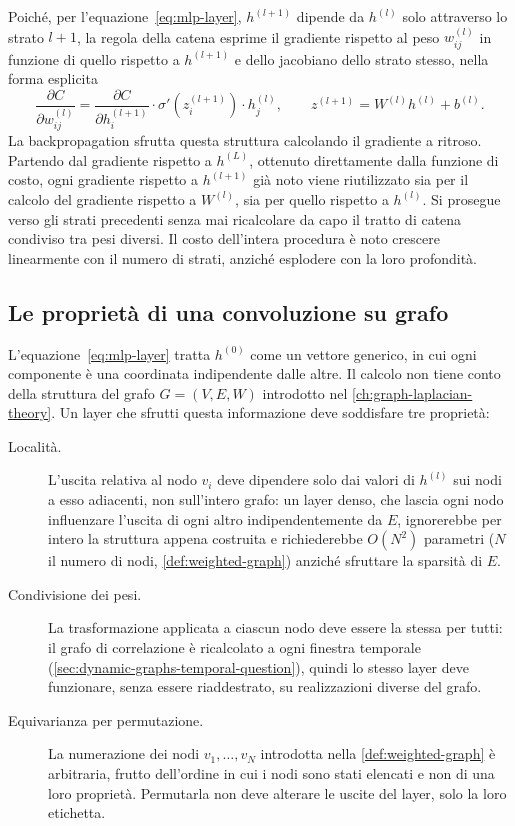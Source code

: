 Poiché, per l'equazione~\eqref{eq:mlp-layer}, $h^{(l+1)}$ dipende da $h^{(l)}$ solo attraverso lo strato $l+1$, la regola della catena esprime il gradiente rispetto al peso $w^{(l)}_{ij}$ in funzione di quello rispetto a $h^{(l+1)}$ e dello jacobiano dello strato stesso, nella forma esplicita
\begin{equation}
\label{eq:backprop-weight-gradient}
\frac{\partial C}{\partial w^{(l)}_{ij}} = \frac{\partial C}{\partial h^{(l+1)}_i} \cdot \sigma'\!\left(z^{(l+1)}_i\right) \cdot h^{(l)}_j, \qquad z^{(l+1)} = W^{(l)}h^{(l)} + b^{(l)}.
\end{equation}
La backpropagation sfrutta questa struttura calcolando il gradiente a ritroso. Partendo dal gradiente rispetto a $h^{(L)}$, ottenuto direttamente dalla funzione di costo, ogni gradiente rispetto a $h^{(l+1)}$ già noto viene riutilizzato sia per il calcolo del gradiente rispetto a $W^{(l)}$, sia per quello rispetto a $h^{(l)}$. Si prosegue verso gli strati precedenti senza mai ricalcolare da capo il tratto di catena condiviso tra pesi diversi. Il costo dell'intera procedura è noto crescere linearmente con il numero di strati, anziché esplodere con la loro profondità.

\subsection{Le proprietà di una convoluzione su grafo}
\label{sec:message-passing-paradigm}

L'equazione~\eqref{eq:mlp-layer} tratta $h^{(0)}$ come un vettore generico, in cui ogni componente è una coordinata indipendente dalle altre. Il calcolo non tiene conto della struttura del grafo $G=(V,E,W)$ introdotto nel \cref{ch:graph-laplacian-theory}. Un layer che sfrutti questa informazione deve soddisfare tre proprietà:

\begin{description}
    \item[Località.] L'uscita relativa al nodo $v_i$ deve dipendere solo dai valori di $h^{(l)}$ sui nodi a esso adiacenti, non sull'intero grafo: un layer denso, che lascia ogni nodo influenzare l'uscita di ogni altro indipendentemente da $E$, ignorerebbe per intero la struttura appena costruita e richiederebbe $O(N^2)$ parametri ($N$ il numero di nodi, \cref{def:weighted-graph}) anziché sfruttare la sparsità di $E$.
    \item[Condivisione dei pesi.] La trasformazione applicata a ciascun nodo deve essere la stessa per tutti: il grafo di correlazione è ricalcolato a ogni finestra temporale (\cref{sec:dynamic-graphs-temporal-question}), quindi lo stesso layer deve funzionare, senza essere riaddestrato, su realizzazioni diverse del grafo.
    \item[Equivarianza per permutazione.] La numerazione dei nodi $v_1,\dots,v_N$ introdotta nella \cref{def:weighted-graph} è arbitraria, frutto dell'ordine in cui i nodi sono stati elencati e non di una loro proprietà. Permutarla non deve alterare le uscite del layer, solo la loro etichetta.
\end{description}

